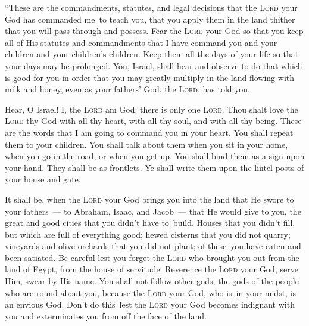 
\begin{inparaenum}
     ``These are the commandments, statutes, and legal decisions that the \textsc{Lord} your God has commanded me\understood\ to teach you, that you apply them in the land thither that you will pass through and possess.%
     Fear the \textsc{Lord} your God so that you keep all of His statutes and commandments that I have command you and your children and your children's children. Keep them all the days of your life so that your days may be prolonged.%
     You, Israel, shall hear and observe to do that which is good for you in order that you may greatly multiply in the land flowing with milk and honey, even as your fathers' God, the \textsc{Lord}, has told you.%
    
     Hear, O Israel! I, the \textsc{Lord} am God: there is only one \textsc{Lord}.%
     Thou shalt love the \textsc{Lord} thy God with all thy heart, with all thy soul, and with all thy being.%
     These are the words that I am going to command you in your heart.%
     You shall repeat them to your children. You shall talk about them when you sit in your home, when you go in the road, or when you get up.%
     You shall bind them as a sign upon your hand. They shall be as frontlets.%
     Ye shall write them upon the lintel posts of your house and gate.%
    
     It shall be, when the \textsc{Lord} your God brings you into the land that He swore to your fathers~--- to Abraham, Isaac, and Jacob~--- that He would give to you, the great and good cities that you didn't have to\understood\ build.%
     Houses that you didn't fill, but which are full of everything good; hewed cisterns that you did not quarry; vineyards and olive orchards that you did not plant; of these\understood\ you have eaten and been satiated.%
     Be careful lest you forget the \textsc{Lord} who brought you out from the land of Egypt, from the house of servitude.%
     Reverence the \textsc{Lord} your God, serve Him, swear by His name.%
     You shall not follow other gods, the gods of the people who are round about you,%
     because the \textsc{Lord} your God, who is\understood\ in your midst, is an envious God. Don't do this\understood\ lest the \textsc{Lord} your God becomes indignant with you and exterminates you from off the face of the land.%
    

\end{inparaenum}
